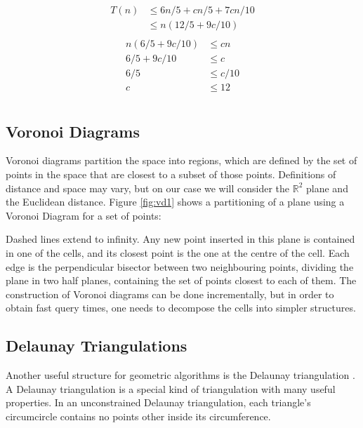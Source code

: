 \begin{align}
\begin{aligned}
T(n) & \le 6n/5 + cn/5 + 7cn/10\\
     & \le n(12/5 + 9c/10)
\end{aligned}
\end{align}
\begin{align}
\begin{aligned}
    n (6/5 + 9c/10) & \le cn \\
    6/5 + 9c/10 & \le c \\
    6/5 & \le c/10 \\
    c & \le 12 \\
\end{aligned}
\end{align}




\subsection{Voronoi Diagrams}
Voronoi diagrams \cite{tricard2} partition the space into regions, which are defined by the set of points in the space that are closest to a subset of those points. Definitions of distance and space may vary, but on our case we will consider the $\mathbb{R}^2$ plane and the Euclidean distance.
Figure \ref{fig:vd1} shows a partitioning of a plane using a Voronoi Diagram for a set of points:

\noindent
Dashed lines extend to infinity. Any new point inserted in this plane is contained in one of the cells, and its closest point is the one at the centre of the cell.
Each edge is the perpendicular bisector between two neighbouring points, dividing the plane in two half planes, containing the set of points closest to each of them.
The construction of Voronoi diagrams can be done incrementally, but in order to obtain fast query times, one needs to decompose the cells into simpler structures. 
\subsection{Delaunay Triangulations}
Another useful structure for geometric algorithms is the Delaunay triangulation \cite{tricard2}.
A Delaunay triangulation \cite{delbible} is a special kind of triangulation with many useful properties. 
In an unconstrained Delaunay triangulation, each triangle's circumcircle contains no points other inside its circumference.

